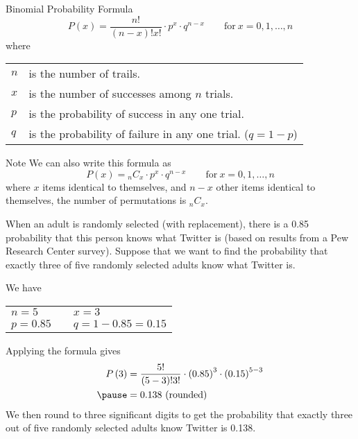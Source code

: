\documentclass{beamer}
\newcommand{\prob}[1]{P\left(#1\right)}
\newcommand{\comb}[2]{{_{#1}C_{#2}}}
\begin{document}
\begin{frame}
\begin{block}{Binomial Probability Formula}
\begin{equation*}
\prob{x}=\dfrac{n!}{{(n-x)}!x!}\cdot p^x\cdot q^{n-x}
\qquad\text{for}~x=0,1,\ldots,n
\end{equation*}
where
\begin{center}
\begin{tabular}{ll}
$n$ & is the number of trails. \\
$x$ & is the number of successes among $n$ trials. \\
$p$ & is the probability of success in any one trial. \\
$q$ & is the probability of failure in any one trial. ($q=1-p$)
\end{tabular}
\end{center}
\end{block}\pause

\begin{block}{Note}
We can also write this formula as 
\begin{equation*}
\prob{x}=\comb{n}{x}\cdot p^x\cdot q^{n-x}
\qquad\text{for}~x=0,1,\ldots,n
\end{equation*}
where $x$ items identical to themselves, and $n-x$ other items identical to themselves, the number of permutations is $\comb{n}{x}$.
\end{block}
\end{frame}

\begin{frame}
\begin{example}
When an adult is randomly selected (with replacement), there is a 0.85 probability that this person knows what Twitter is (based on results from a Pew Research Center survey). Suppose that we want to find the probability that exactly three of five randomly selected adults know what Twitter is.\pause

\vspace{1mm}
We have
\begin{center}
\begin{tabular}{lcl}
$n = 5$ &\quad& $x = 3$ \\
$p = 0.85$ &\quad& $q = 1-0.85=0.15$
\end{tabular}
\end{center}\pause
Applying the formula gives
\begin{equation*}
\begin{aligned}
\prob{3}&=\dfrac{5!}{{(5-3)}!3!}\cdot {(0.85)}^{3}\cdot {(0.15)}^{5-3}\\\pause
&= 0.138~\text{(rounded)}
\end{aligned}
\end{equation*}\pause
We then round to three significant digits to get the probability that exactly three out of five randomly selected adults know Twitter is 0.138.
\end{example}
\end{frame}
\end{document}
